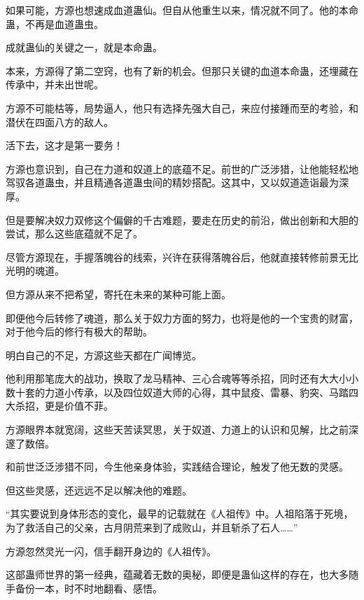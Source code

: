 \begin{this_body}
如果可能，方源也想速成血道蛊仙。但自从他重生以来，情况就不同了。他的本命蛊，不再是血道蛊虫。

成就蛊仙的关键之一，就是本命蛊。

本来，方源得了第二空窍，也有了新的机会。但那只关键的血道本命蛊，还埋藏在传承中，并未出世呢。

方源不可能枯等，局势逼人，他只有选择先强大自己，来应付接踵而至的考验，和潜伏在四面八方的敌人。

活下去，这才是第一要务！

方源也意识到，自己在力道和奴道上的底蕴不足。前世的广泛涉猎，让他能轻松地驾驭各道蛊虫，并且精通各道蛊虫间的精妙搭配。这其中，又以奴道造诣最为深厚。

但是要解决奴力双修这个偏僻的千古难题，要走在历史的前沿，做出创新和大胆的尝试，那么这些底蕴就不足了。

尽管方源现在，手握落魄谷的线索，兴许在获得落魄谷后，他就直接转修前景无比光明的魂道。

但方源从来不把希望，寄托在未来的某种可能上面。

即便他今后转修了魂道，那么关于奴力方面的努力，也将是他的一个宝贵的财富，对于他今后的修行有极大的帮助。

明白自己的不足，方源这些天都在广闻博览。

他利用那笔庞大的战功，换取了龙马精神、三心合魂等等杀招，同时还有大大小小数十套的力道小传承，以及四位奴道大师的心得，其中鼠疫、雷暴、豹突、马踏四大杀招，更是价值不菲。

方源眼界本就宽阔，这些天苦读冥思，关于奴道、力道上的认识和见解，比之前深邃了数倍。

和前世泛泛涉猎不同，今生他亲身体验，实践结合理论，触发了他无数的灵感。

但这些灵感，还远远不足以解决他的难题。

“其实要说到身体形态的变化，最早的记载就在《人祖传》中。人祖陷落于死境，为了救活自己的父亲，古月阴荒来到了成败山，并且斩杀了石人……”

方源忽然灵光一闪，信手翻开身边的《人祖传》。

这部蛊师世界的第一经典，蕴藏着无数的奥秘，即便是蛊仙这样的存在，也大多随手备份一本，时不时地翻看、感悟。

\end{this_body}

